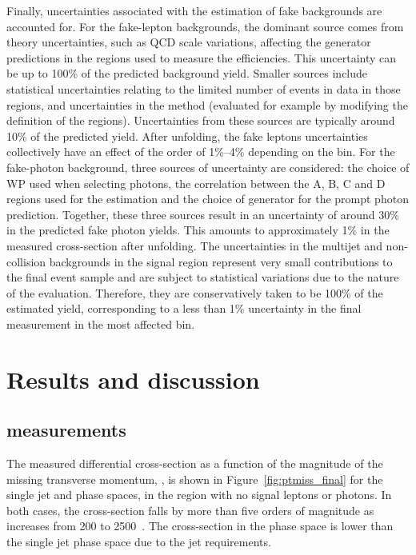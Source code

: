 \documentclass[atlasdraft=false, cernpreprint, UKenglish, texmf, orcidlogo]{atlasdoc}
\begin{document}
Finally, uncertainties associated with the estimation of fake backgrounds are accounted for.
For the fake-lepton backgrounds, the dominant source comes from theory uncertainties, such as QCD scale variations, affecting the generator predictions in the regions used to measure the efficiencies. This uncertainty can be up to 100\% of the predicted background yield.
Smaller sources include statistical uncertainties relating to the limited number of events in data in those regions, and uncertainties in the method (evaluated for example by modifying the definition of the regions).
Uncertainties from these sources are typically around 10\% of the predicted yield. After unfolding, the fake leptons uncertainties collectively have an effect of the order of 1\%--4\% depending on the bin.
For the fake-photon background, three sources of uncertainty are considered: the choice of WP used when selecting photons, the correlation between the A, B, C and D regions used for the estimation and the choice of generator for the prompt photon prediction.
Together, these three sources result in an uncertainty of around 30\% in the predicted fake photon yields. This amounts to approximately 1\% in the measured cross-section after unfolding.
The  uncertainties in the multijet and non-collision backgrounds in the signal region represent very small contributions to the final event sample and are subject to statistical variations due to the nature of the evaluation. Therefore, they are conservatively taken to be 100\% of the estimated yield, corresponding to a less than 1\% uncertainty in the final measurement in the most affected bin.


 

\FloatBarrier
\section{Results and discussion}
\label{sec:results}
 
\subsection{\ptmiss measurements}
 
The measured differential cross-section as a function of the magnitude of the missing transverse momentum, \ptmiss,
is shown in Figure~\ref{fig:ptmiss_final} for the single jet and \vbf phase spaces, in the region with no signal leptons or photons.
In both cases, the cross-section falls by more than five orders of magnitude as \ptmiss increases from 200 to 2500~\GeV.
The cross-section in the \vbf phase space is lower than the single jet phase space due to the jet requirements.
 
\end{document}
